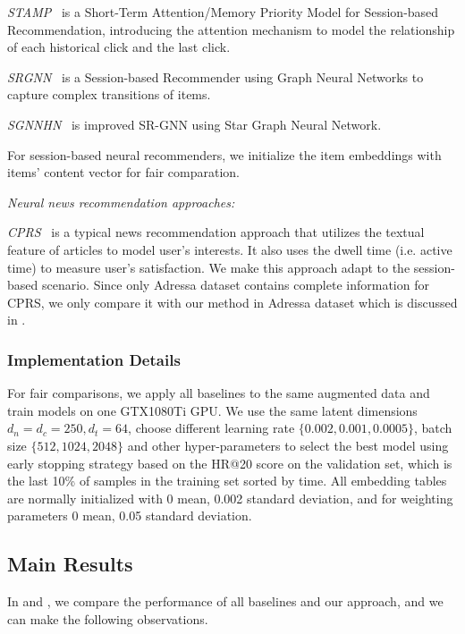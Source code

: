   \textit{STAMP}~\cite{liu2018stamp} is a Short-Term Attention/Memory Priority Model for Session-based Recommendation, introducing the attention mechanism to model the relationship of each historical click and the last click.

  \textit{SRGNN}~\cite{wu2019session} is a Session-based Recommender using Graph Neural Networks to capture complex transitions of items.

  \textit{SGNNHN}~\cite{pan2020star} is improved SR-GNN using Star Graph Neural Network.

  For session-based neural recommenders, we initialize the item embeddings with items' content vector for fair comparation.

\noindent
\textit{Neural news recommendation approaches:}

\textit{CPRS}~\cite{wu2020CPRS} is a typical news recommendation approach that utilizes the textual feature of articles to model user's interests. It also uses the dwell time (i.e. active time) to measure user's satisfaction. We make this approach adapt to the session-based scenario. Since only Adressa dataset contains complete information for CPRS, we only compare it with our method in Adressa dataset which is discussed in .

\subsubsection{Implementation Details}
For fair comparisons, we apply all baselines to the same augmented data and train 
models on one GTX1080Ti GPU.
We use the same latent dimensions $d_n=d_c=250, d_t=64$, choose different learning rate $\{0.002, 0.001, 0.0005\}$, batch size $\{512, 1024, 2048\}$ and other hyper-parameters to select the best model using early stopping strategy based on the HR@20 score on the validation set, which is the last 10\% of samples in the training set sorted by time. All embedding tables are normally initialized with 0 mean, 0.002 standard deviation, and for weighting parameters 0 mean, 0.05 standard deviation.

\subsection{Main Results}
\label{sec:mainres}

In  and , we compare the performance of all baselines and our
approach, and we can make the following observations.

